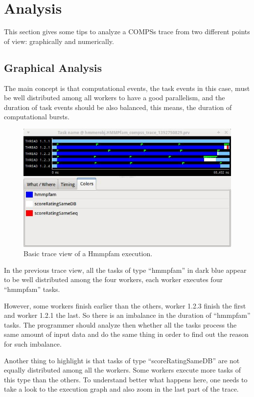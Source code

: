 \section{Analysis}
\label{sec:Analysis}
This section gives some tips to analyze a COMPSs trace from two different points of view:
graphically and numerically.

\subsection{Graphical Analysis}
The main concept is that computational events, the task events in this case, must be well 
distributed among all workers to have a good parallelism, and the duration of task events 
should be also balanced, this means, the duration of computational bursts.

\begin{figure}[ht!]
  \centering
    \includegraphics[width=1.0\textwidth]{./Sections/5_Analysis/Figures/8.jpeg}
    \caption{Basic trace view of a Hmmpfam execution.}
\end{figure}

In the previous trace view, all the tasks of type ``hmmpfam'' in dark blue appear to be well 
distributed among the four workers, each worker executes four ``hmmpfam'' tasks.

However, some workers finish earlier than the others, worker 1.2.3 finish the first and worker 1.2.1 
the last. So there is an imbalance in the duration of ``hmmpfam'' tasks. The programmer should 
analyze then whether all the tasks process the same amount of input data and do the same thing 
in order to find out the reason for such imbalance.

Another thing to highlight is that tasks of type ``scoreRatingSameDB'' are not equally distributed 
among all the workers. Some workers execute more tasks of this type than the others. 
To understand better what happens here, one needs to take a look to the execution graph and also zoom 
in the last part of the trace.

